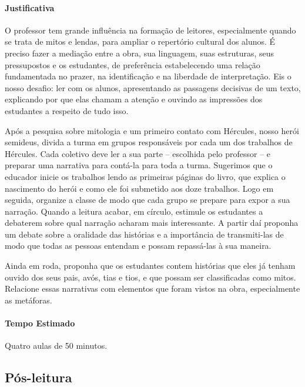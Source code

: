 \documentclass[11pt]{extarticle}
\begin{document}
\paragraph{Justificativa} O professor tem grande influência na formação de leitores, especialmente quando se trata de mitos e lendas, para ampliar o repertório cultural dos alunos. É preciso fazer a mediação entre a obra, sua linguagem, suas estruturas, seus pressupostos e os estudantes, de preferência estabelecendo uma relação fundamentada no prazer, na identificação e na liberdade de interpretação. Eis o nosso desafio: ler com os alunos, apresentando as passagens decisivas de um texto, explicando por que elas chamam a atenção e  ouvindo as impressões dos estudantes a respeito de tudo isso. 

Após a pesquisa sobre mitologia e um primeiro contato com Hércules, nosso herói semideus, divida a turma em grupos responsáveis por cada um dos trabalhos de Hércules. Cada coletivo deve ler a sua parte -- escolhida pelo professor -- e preparar uma narrativa para contá-la para toda a turma. Sugerimos que o educador inicie os trabalhos lendo as primeiras páginas do livro, que explica o nascimento do herói e como ele foi submetido aos doze trabalhos. Logo em seguida, organize a classe de modo que cada grupo se prepare para expor a sua narração. Quando a leitura acabar, em círculo, estimule os estudantes a debaterem sobre qual narração acharam mais interessante. A partir daí proponha um debate sobre a oralidade das histórias e a importância de transmiti-las de modo que todas as pessoas entendam e possam repassá-las à sua maneira. 

Ainda em roda, proponha que os estudantes contem histórias que eles já tenham ouvido dos seus pais, avós, tias e tios, e que possam ser classificadas como mitos. Relacione essas narrativas com elementos que foram vistos na obra, especialmente as metáforas. 


\paragraph{Tempo Estimado} Quatro aulas de 50 minutos.

\subsection{Pós-leitura}
\end{document}

